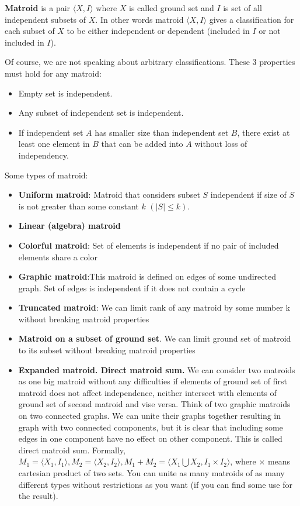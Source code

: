 \documentclass[a4paper]{article}
\begin{document}
\begin{landscape}
\begin{multicols}{2}
\textbf{Matroid} is a pair $⟨X,I⟩$ where $X$ is called ground set and $I$ is set of all independent subsets of $X$. In other words matroid $⟨X,I⟩$ gives a classification for each subset of $X$ to be either independent or dependent (included in $I$ or not included in $I$).

Of course, we are not speaking about arbitrary classifications. These 3 properties must hold for any matroid:

\begin{itemize}
    \item Empty set is independent.
    \item Any subset of independent set is independent.
    \item If independent set $A$ has smaller size than independent set $B$, there exist at least one element in $B$ that can be added into $A$ without loss of independency.
\end{itemize}

Some types of matroid:
\begin{itemize}
    \item \textbf{Uniform matroid}: Matroid that considers subset $S$ independent if size of $S$ is not greater than some constant $k$ $(|S| \leq k)$.
    \item \textbf{Linear (algebra) matroid}
    \item \textbf{Colorful matroid}: Set of elements is independent if no pair of included elements share a color
    \item \textbf{Graphic matroid}:This matroid is defined on edges of some undirected graph. Set of edges is independent if it does not contain a cycle
    \item \textbf{Truncated matroid}: We can limit rank of any matroid by some number k without breaking matroid properties
    \item \textbf{Matroid on a subset of ground set}. We can limit ground set of matroid to its subset without breaking matroid properties
    \item \textbf{Expanded matroid. Direct matroid sum. }We can consider two matroids as one big matroid without any difficulties if elements of ground set of first matroid does not affect independence, neither intersect with elements of ground set of second matroid and vise versa. Think of two graphic matroids on two connected graphs. We can unite their graphs together resulting in graph with two connected components, but it is clear that including some edges in one component have no effect on other component. This is called direct matroid sum. Formally, $M_1=⟨X_1,I_1⟩, M_2=⟨X_2,I_2⟩, M_1+M_2=⟨X_1 \bigcup X_2,I_1\times I_2⟩$, where $\times$ means cartesian product of two sets. You can unite as many matroids of as many different types without restrictions as you want (if you can find some use for the result).


\end{itemize}
\end{multicols}
\end{landscape}
\end{document}
